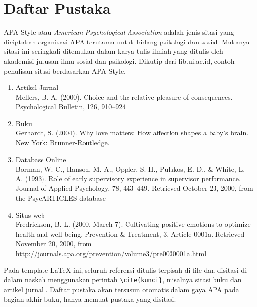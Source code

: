 \documentclass{bukupedia}
\begin{document}
\section{Daftar Pustaka}
APA Style atau \textit{American Psychological Association} adalah jenis
sitasi yang diciptakan organisasi APA terutama untuk bidang psikologi
dan sosial. Makanya sitasi ini seringkali ditemukan dalam karya tulis
ilmiah yang ditulis oleh akademisi jurusan ilmu sosial dan psikologi.
Dikutip dari lib.ui.ac.id, contoh penulisan sitasi berdasarkan APA
Style.

\begin{enumerate}[label=\alph*), labelindent=\parindent, leftmargin=*, nosep]
  \item Artikel Jurnal\\
    Mellers, B. A. (2000). Choice and the relative pleasure of
    consequences. Psychological Bulletin, 126, 910--924
  \item Buku\\
    Gerhardt, S. (2004). Why love matters: How affection shapes a
    baby's brain. New York: Brunner-Routledge.
  \item Database Online\\
    Borman, W. C., Hanson, M. A., Oppler, S. H., Pulakos, E. D., \&
    White, L. A. (1993). Role of early supervisory experience in
    supervisor performance. Journal of Applied Psychology, 78,
    443--449. Retrieved October 23, 2000, from the PsycARTICLES
    database
  \item Situs web\\
    Fredrickson, B. L. (2000, March 7). Cultivating positive emotions
    to optimize health and well-being. Prevention \& Treatment, 3,
    Article 0001a. Retrieved November 20, 2000, from
    \url{http://journals.apa.org/prevention/volume3/pre0030001a.html}
\end{enumerate}

Pada template LaTeX ini, seluruh referensi ditulis terpisah di file
 dan disitasi di dalam naskah menggunakan perintah
\verb|\cite{kunci}|, misalnya sitasi buku \cite{ali2017milenial} dan
artikel jurnal \cite{aziri2011job, bencsik2016generations,
berkup2014working}. Daftar pustaka akan tersusun otomatis dalam gaya
APA pada bagian akhir buku, hanya memuat pustaka yang disitasi.
\end{document}
